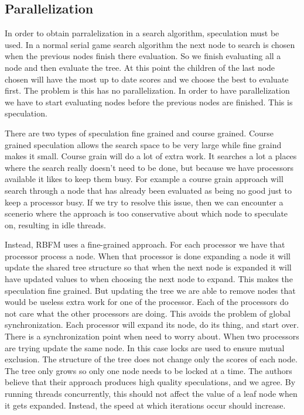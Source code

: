 \documentclass[conference]{IEEEtran}
\begin{document}
\subsection{Parallelization}
In order to obtain parralelization in a search algorithm, speculation must be used. In a normal serial game search algorithm the next node to search is chosen when the previous nodes finish there evaluation. So we finish evaluating all a node and then evaluate the tree.  At this point the children of the last node chosen will have the most up to date scores and we choose the best to evaluate first. The problem is this  has no parallelization. In order to have parallelization we have to start evaluating nodes before the previous nodes are finished. This is speculation.\par
There are two types of speculation fine grained and course grained. Course grained speculation allows the search space to be very large while fine graind makes it small. Course grain will do a lot of extra work. It searches a lot a places where the search really doesn't need to be done, but because we have processors available it likes to keep them busy. For example a course grain approach will search through a node that has already been evaluated as being no good just to keep a processor busy. If we try to resolve this issue, then we can encounter a scenerio where the approach is too conservative about which node to speculate on, resulting in idle threads.\par
Instead, RBFM uses a fine-grained approach. For each processor we have that processor process a node. When that processor is done expanding a node it will update the shared tree structure so that when the next node is expanded it will have updated values to when choosing the next node to expand. This makes the speculation fine grained. But updating the tree we are able to remove nodes that would be useless extra work for one of the processor. Each of the processors do not care what the other processors are doing. This avoids the problem of global synchronization. Each processor will expand its node, do its thing, and start over. There is a synchronization point when need to worry about.  When two processors are trying update the same node. In this case locks are used to ensure mutual exclusion. The structure of the tree does not change only the scores of each node. The tree only grows so only one node needs to be locked at a time. The authors believe that their approach produces high quality speculations, and we agree. By running threads concurrently, this should not affect the value of a leaf node when it gets expanded. Instead, the speed at which iterations occur should increase. 
\end{document}
